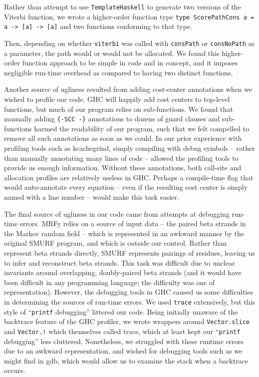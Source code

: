 \documentclass[preprint,nonatbib,blockstyle,nocopyrightspace,times]{sigplanconf}
\begin{document}
Rather than attempt to use \texttt{TemplateHaskell} to generate two versions of 
the Viterbi function, we wrote a higher-order function type 
\lstinline!type ScorePathCons a = a -> [a] -> [a]! and two functions conforming to that type.

Then, depending on whether \texttt{viterbi} was called with \texttt{consPath} 
or \texttt{consNoPath} as a parameter, the path would or would not be 
allocated.
We found this higher-order function approach to be simple in code 
and in concept, and it imposes negligible run-time overhead as compared to 
having two distinct functions.



Another source of ugliness resulted from adding cost-center annotations when we 
wished to profile our code.
GHC will happily add cost centers to top-level 
functions, but much of our program relies on sub-functions.
We found that 
manually adding \texttt{\{-SCC -\}} annotations to dozens of guard clauses and 
sub-functions harmed the readability of our program, such that we felt 
compelled to remove all such annotations as soon as we could.
In our prior 
experience with profiling tools such as kcachegrind, simply compiling with 
debug symbols -- rather than manually annotating many lines of code -- allowed 
the profiling tools to provide us enough information.
Without these 
annotations, both call-site and allocation profiles are relatively useless in 
GHC.
Perhaps a compile-time flag that would auto-annotate every equation -- 
even if the resulting cost center is simply named with a line number -- would 
make this task easier.

The final source of ugliness in our code came from attempts at debugging 
run-time errors.
MRFy relies on a source of input data -- the paired beta 
strands in the Markov random field -- which is represented in an awkward manner 
by the original SMURF program, and which is outside our control.
Rather than 
represent beta strands directly, SMURF represents pairings of residues, leaving 
us to infer and reconstruct beta strands.
This task was difficult due to 
unclear invariants around overlapping, doubly-paired beta strands (and it would 
have been difficult in any programming language; the difficulty was one of 
representation).
However, the debugging tools in GHC caused us some 
difficulties in determining the sources of run-time errors.
We used 
\texttt{trace} extensively, but this style of ``\texttt{printf} debugging'' 
littered our code.
Being initially unaware of the backtrace feature of the GHC 
profiler, we wrote wrappers around \texttt{Vector.slice} and \texttt{Vector.!} 
which themselves called trace, which at least kept our ``\texttt{printf} 
debugging'' less cluttered.
Nonetheless, we struggled with these runtime errors 
due to an awkward representation, and wished for debugging tools such as we 
might find in gdb, which would allow us to examine the stack when a backtrace 
occurs.
 
\end{document}
